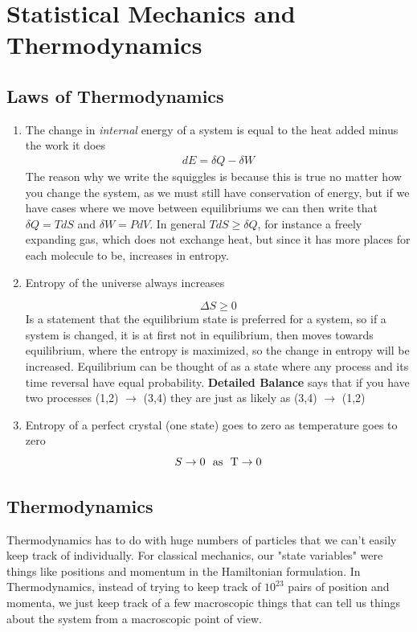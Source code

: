 

\chapter{Statistical Mechanics and Thermodynamics}



\section{Laws of Thermodynamics}
\begin{enumerate}
\item The change in \emph{internal} energy of a system is equal to the heat added minus the work it does
\begin{align}
dE = \delta Q - \delta W
\end{align}
The reason why we write the squiggles is because this is true no matter how you change the system, as we must still have conservation of energy, but if we have cases where we move between equilibriums we can then write that $\delta Q = T dS$ and $\delta W = PdV$. In general $TdS \ge \delta Q$, for instance a freely expanding gas, which does not exchange heat, but since it has more places for each molecule to be, increases in entropy.


\item Entropy of the universe always increases

$$\Delta S \ge 0$$ Is a statement that the equilibrium state is preferred for a system, so if a system is changed, it is at first not in equilibrium, then moves towards equilibrium, where the entropy is maximized, so the change in entropy will be increased. Equilibrium can be thought of as a state where any process and its time reversal have equal probability. \textbf{Detailed Balance} says that if you have two processes (1,2) $\rightarrow$ (3,4) they are just as likely as (3,4) $\rightarrow$ (1,2)


\item Entropy of a perfect crystal (one state) goes to zero as temperature goes to zero
 $$S\rightarrow 0 ~~\rm{as}~~ T\rightarrow 0$$

\end{enumerate}

\section{Thermodynamics}
Thermodynamics has to do with huge numbers of particles that we can't easily keep track of individually. For classical mechanics, our "state variables" were things like positions and momentum in the Hamiltonian formulation. In Thermodynamics,  instead of trying to keep track of $10^{23}$ pairs of position and momenta, we just keep track of a few macroscopic things that can tell us things about the system from a macroscopic point of view. 


